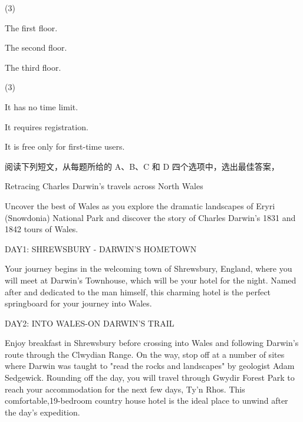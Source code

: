 \documentclass{英语试卷}
\begin{document}
\begin{choices}(3)
  \item The first floor.
  \item The second floor.
  \item The third floor.
\end{choices}
\begin{choices}(3)
  \item It has no time limit.
  \item It requires registration.
  \item It is free only for first-time users.
\end{choices}
\par 阅读下列短文，从每题所给的 A、B、C 和 D 四个选项中，选出最佳答案，\par
{}
\par Retracing Charles Darwin's travels across North Wales\par
\par Uncover the best of Wales as you explore the dramatic landscapes of Eryri (Snowdonia) National Park and discover the story of Charles Darwin's 1831 and 1842 tours of Wales.\par
\par DAY1: SHREWSBURY - DARWIN'S HOMETOWN\par
\par Your journey begins in the welcoming town of Shrewsbury, England, where you will meet at Darwin's Townhouse, which will be your hotel for the night. Named after and dedicated to the man himself, this charming hotel is the perfect springboard for your journey into Wales.\par
\par DAY2: INTO WALES-ON DARWIN'S TRAIL\par
\par Enjoy breakfast in Shrewsbury before crossing into Wales and following Darwin's route through the Clwydian Range. On the way, stop off at a number of sites where Darwin was taught to "read the rocks and landscapes" by geologist Adam Sedgewick. Rounding off the day, you will travel through Gwydir Forest Park to reach your accommodation for the next few days, Ty'n Rhos. This comfortable,19-bedroom country house hotel is the ideal place to unwind after the day's expedition.\par
\end{document}
